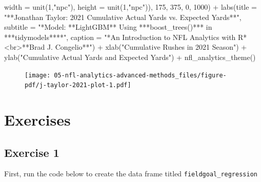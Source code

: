 \documentclass[
  letterpaper,
]{krantz}
\newenvironment{Shaded}{\begin{snugshade}}{\end{snugshade}}
\newcommand{\AttributeTok}[1]{\textcolor[rgb]{0.40,0.45,0.13}{#1}}
\newcommand{\DecValTok}[1]{\textcolor[rgb]{0.68,0.00,0.00}{#1}}
\newcommand{\FunctionTok}[1]{\textcolor[rgb]{0.28,0.35,0.67}{#1}}
\newcommand{\NormalTok}[1]{\textcolor[rgb]{0.00,0.23,0.31}{#1}}
\newcommand{\SpecialCharTok}[1]{\textcolor[rgb]{0.37,0.37,0.37}{#1}}
\newcommand{\StringTok}[1]{\textcolor[rgb]{0.13,0.47,0.30}{#1}}
\begin{document}
\begin{Shaded}
\begin{Highlighting}[]
                               \AttributeTok{width =} \FunctionTok{unit}\NormalTok{(}\DecValTok{1}\NormalTok{,}\StringTok{"npc"}\NormalTok{), }
                               \AttributeTok{height =} \FunctionTok{unit}\NormalTok{(}\DecValTok{1}\NormalTok{,}\StringTok{"npc"}\NormalTok{)),}
                    \DecValTok{175}\NormalTok{, }\DecValTok{375}\NormalTok{, }\DecValTok{0}\NormalTok{, }\DecValTok{1000}\NormalTok{) }\SpecialCharTok{+}
  \FunctionTok{labs}\NormalTok{(}\AttributeTok{title =} \StringTok{"**Jonathan Taylor: 2021 Cumulative Actual Yards vs. Expected Yards**"}\NormalTok{,}
       \AttributeTok{subtitle =} \StringTok{"*Model: **LightGBM** Using ***boost\_trees()*** in ***tidymodels****"}\NormalTok{,}
       \AttributeTok{caption =} \StringTok{"*An Introduction to NFL Analytics with R*\textless{}br\textgreater{}**Brad J. Congelio**"}\NormalTok{) }\SpecialCharTok{+}
  \FunctionTok{xlab}\NormalTok{(}\StringTok{"Cumulative Rushes in 2021 Season"}\NormalTok{) }\SpecialCharTok{+}
  \FunctionTok{ylab}\NormalTok{(}\StringTok{"Cumulative Actual Yards and Expected Yards"}\NormalTok{) }\SpecialCharTok{+}
  \FunctionTok{nfl\_analytics\_theme}\NormalTok{()}
\end{Highlighting}
\end{Shaded}

\begin{figure}[H]

{\centering \texttt{[image: 05-nfl-analytics-advanced-methods\_files/figure-pdf/j-taylor-2021-plot-1.pdf]}

}

\end{figure}

\hypertarget{exercises-3}{%
\section{Exercises}\label{exercises-3}}

\hypertarget{exercise-1-3}{%
\subsection{Exercise 1}\label{exercise-1-3}}

First, run the code below to create the data frame titled
\texttt{fieldgoal\_regression}
\end{document}
